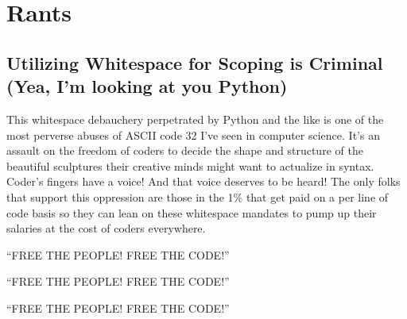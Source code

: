 \chapter{Rants}


\section{Utilizing Whitespace for Scoping is Criminal (Yea, I'm looking at you Python)}
\label{rant:whitespacesucks}
\par
This whitespace debauchery perpetrated by Python and the like is one of the most perverse abuses of ASCII code 32 I've seen in computer science. It's an assault on the freedom of coders to decide the shape and structure of the beautiful sculptures their creative minds might want to actualize in syntax. Coder's fingers have a voice! And that voice deserves to be heard! The only folks that support this oppression are those in the 1\% that get paid on a per line of code basis so they can lean on these whitespace mandates to pump up their salaries at the cost of coders everywhere.
\par
``FREE THE PEOPLE! FREE THE CODE!''
\par
``FREE THE PEOPLE! FREE THE CODE!''
\par
``FREE THE PEOPLE! FREE THE CODE!''

